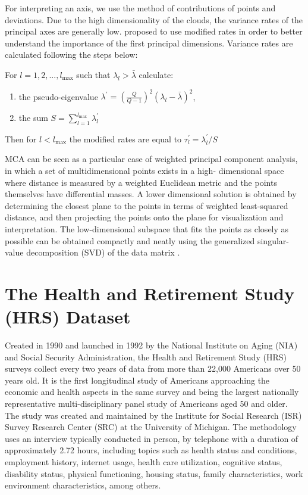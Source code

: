 \documentclass[conference]{IEEEtran}
\begin{document}
For interpreting an axis, we use the method of contributions of points
and deviations. Due to the high dimensionality of the clouds, the
variance rates of the principal axes are generally low.
\cite{benzecri1992correspondence} proposed to use modified rates in
order to better understand the importance of the first principal
dimensions. Variance rates are calculated following the steps below:

For \(l = 1,2,...,l_{\max}\) such that \(\lambda_l > \bar{\lambda}\)
calculate:

\begin{enumerate}
\def\labelenumi{\arabic{enumi}.}
\item
  the pseudo-eigenvalue
  \(\lambda^\prime = \left( \frac{Q}{Q-1} \right)^2(\lambda_l - \bar{\lambda})^2\),
\item
  the sum \(S=\sum_{l=1}^{l_{\max}} \lambda^{\prime} _l\)
\end{enumerate}

Then for \(l < l_{\max}\) the modified rates are equal to
\(\tau^\prime _l = \lambda^\prime_l / S\)

MCA can be seen as a particular case of weighted principal component
analysis, in which a set of multidimensional points exists in a high-
dimensional space where distance is measured by a weighted Euclidean
metric and the points themselves have differential masses. A lower
dimensional solution is obtained by determining the closest plane to the
points in terms of weighted least-squared distance, and then projecting
the points onto the plane for visualization and interpretation. The
low-dimensional subspace that fits the points as closely as possible can
be obtained compactly and neatly using the generalized singular-value
decomposition (SVD) of the data matrix \cite{greenacre2006multiple}.

\hypertarget{the-health-and-retirement-study-hrs-dataset}{%
\section{The Health and Retirement Study (HRS)
Dataset}\label{the-health-and-retirement-study-hrs-dataset}}

Created in 1990 and launched in 1992 by the National Institute on Aging
(NIA) and Social Security Administration, the Health and Retirement
Study (HRS) surveys collect every two years of data from more than
22,000 Americans over 50 years old. It is the first longitudinal study
of Americans approaching the economic and health aspects in the same
survey and being the largest nationally representative
multi-disciplinary panel study of Americans aged 50 and older. The study
was created and maintained by the Institute for Social Research (ISR)
Survey Research Center (SRC) at the University of Michigan. The
methodology uses an interview typically conducted in person, by
telephone with a duration of approximately 2.72 hours, including topics
such as health status and conditions, employment history, internet
usage, health care utilization, cognitive status, disability status,
physical functioning, housing status, family characteristics, work
environment characteristics, among others.
\end{document}
